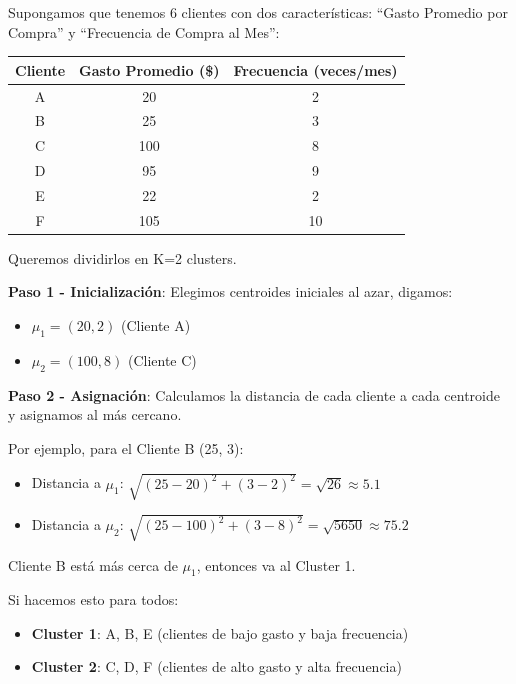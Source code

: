 \documentclass[12pt]{article}
\begin{document}
Supongamos que tenemos 6 clientes con dos características: ``Gasto Promedio por Compra'' y ``Frecuencia de Compra al Mes'':

\begin{table}[H]
    \centering
    \begin{tabular}{ccc}
        \toprule
        Cliente & Gasto Promedio (\$) & Frecuencia (veces/mes) \\
        \midrule
        A & 20 & 2 \\
        B & 25 & 3 \\
        C & 100 & 8 \\
        D & 95 & 9 \\
        E & 22 & 2 \\
        F & 105 & 10 \\
        \bottomrule
    \end{tabular}
\end{table}

Queremos dividirlos en K=2 clusters.

\vspace{0.5em}

\textbf{Paso 1 - Inicialización}: Elegimos centroides iniciales al azar, digamos:
\begin{itemize}
    \item $\mu_1 = (20, 2)$ (Cliente A)
    \item $\mu_2 = (100, 8)$ (Cliente C)
\end{itemize}

\vspace{0.5em}

\textbf{Paso 2 - Asignación}: Calculamos la distancia de cada cliente a cada centroide y asignamos al más cercano.

Por ejemplo, para el Cliente B (25, 3):
\begin{itemize}
    \item Distancia a $\mu_1$: $\sqrt{(25-20)^2 + (3-2)^2} = \sqrt{26} \approx 5.1$
    \item Distancia a $\mu_2$: $\sqrt{(25-100)^2 + (3-8)^2} = \sqrt{5650} \approx 75.2$
\end{itemize}

Cliente B está más cerca de $\mu_1$, entonces va al Cluster 1.

Si hacemos esto para todos:
\begin{itemize}
    \item \textbf{Cluster 1}: A, B, E (clientes de bajo gasto y baja frecuencia)
    \item \textbf{Cluster 2}: C, D, F (clientes de alto gasto y alta frecuencia)
\end{itemize}
\end{document}

